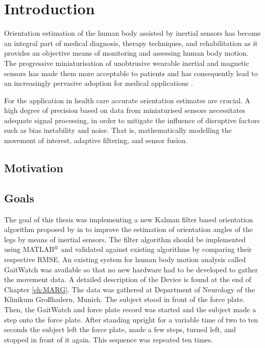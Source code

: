 \chapter{Introduction}
\label{ch:Introduction}

Orientation estimation of the human body assisted by inertial sensors has become an integral part of medical diagnosis, therapy techniques, and rehabilitation as it provides an objective means of monitoring and assessing human body motion. The progressive miniaturisation of unobtrusive wearable inertial and magnetic sensors has made them more acceptable to patients and has consequently lead to an increasingly pervasive adoption for medical applications \cite{wee_soon_ambulatory_2008}.

For the application in health care accurate orientation estimates are crucial. A high degree of precision based on data from miniaturised sensors necessitates adequate signal processing, in order to mitigate the influence of disruptive factors such as bias instability and noise. That is, mathematically modelling the movement of interest, adaptive filtering, and sensor fusion.

\section{Motivation}


\section{Goals}

The goal of this thesis was implementing a new Kalman filter based orientation algorithm proposed by \citeauthor{bennett_motion_2014} in \cite{bennett_motion_2014} to improve the estimation of orientation angles of the legs by means of inertial sensors. The filter algorithm should be implemented using MATLAB$\textsuperscript{\textregistered}$ and validated against existing algorithms by comparing their respective \gls{RMSE}. An existing system for human body motion analysis called GaitWatch was available so that no new hardware had to be developed to gather the movement data. A detailed description of the Device is found at the end of Chapter \ref{ch:MARG}. The data was gathered at Department of Neurology of the Klinikum Großhadern, Munich. The subject stood in front of the force plate. Then, the GaitWatch and force plate record was started and the subject made a step onto the force plate. After standing upright for a variable time of two to ten seconds the subject left the force plate, made a few steps, turned left, and stopped in front of it again. This sequence was repeated ten times.



